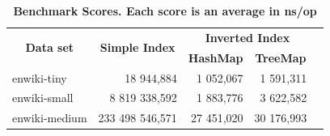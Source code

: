 \begin{table}[!h]
    \centering
    \caption{\textbf{Benchmark Scores. Each score is an average in ns/op}}
    \begin{tabular}{|l|r|r|r|l}
        \cline{1-4}
        \multicolumn{1}{|c|}{\multirow{2}{*}{\textbf{Data set}}} & \multicolumn{1}{c|}{\multirow{2}{*}{\textbf{Simple Index}}} & \multicolumn{2}{c|}{\textbf{Inverted Index}}                                  &  \\ \cline{3-4}
        \multicolumn{1}{|c|}{}                                   & \multicolumn{1}{c|}{}                                       & \multicolumn{1}{c|}{\textbf{HashMap}} & \multicolumn{1}{c|}{\textbf{TreeMap}} &  \\ \cline{1-4}
        enwiki-tiny                                              & 18 944,884                                                  & 1 052,067                             & 1 591,311                             &  \\ \cline{1-4}
        enwiki-small                                             & 8 819 338,592                                               & 1 883,776                             & 3 622,582                             &  \\ \cline{1-4}
        enwiki-medium                                            & 233 498 546,571                                             & 27 451,020                            & 30 176,993                            &  \\ \cline{1-4}
    \end{tabular}
    \label{table:result}
\end{table}

